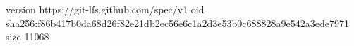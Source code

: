 version https://git-lfs.github.com/spec/v1
oid sha256:f86b417b0da68d26f82e21db2ec56e6c1a2d3e53b0c688828a9e542a3ede7971
size 11068
